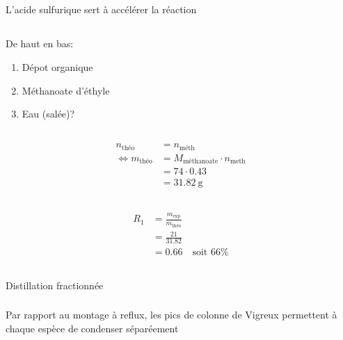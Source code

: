 \documentclass{article}
\begin{document}
\subsection{}
L'acide sulfurique sert à accélérer la réaction

\subsection{}
De haut en bas:

\begin{enumerate}
	\item Dépot organique
	\item Méthanoate d'éthyle
	\item Eau (salée)?
\end{enumerate}

\subsection{}

\[\begin{split}
	n_{\text{théo}} &= n_{\text{méth}} \\
	\iff m_{\text{théo}} &= M_{\text{méthanoate}} \cdot n_{\text{meth}} \\
			     &= 74 \cdot 0.43 \\
			     &= \SI{31.82}{\gram}
\end{split}\]

\subsection{}

\[\begin{split}
	R_1 &= \frac{m_{\text{exp}}}{m_{\text{théo}}} \\
	    &= \frac{21}{31.82} \\
	    &= 0.66 \quad\text{soit } 66\%
\end{split}\]

\subsection{}
\subsubsection{}
Distillation fractionnée

\subsubsection{}
Par rapport au montage à reflux, les pics de colonne de Vigreux
permettent à chaque espèce de condenser séparéement
\end{document}
